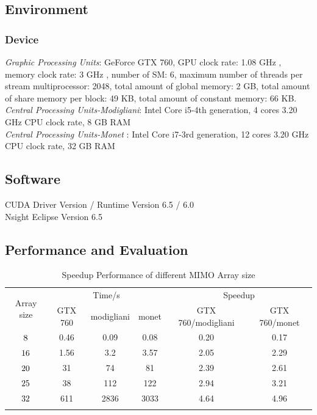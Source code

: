 \documentclass[12pt,a4paper,final]{article}
\begin{document}
\begin{spacing}{2.5}
\subsection{Environment}
\subsubsection{Device}
\emph{Graphic Processing Units}: GeForce GTX 760, GPU clock rate: 1.08 GHz , memory clock rate: 3 GHz , number of SM: 6, maximum number of threads per stream multiprocessor: 2048, total amount of global memory: 2 GB, total amount of share memory per block: 49 KB, total amount of constant memory: 66 KB. \\
\emph{Central Processing Units-Modigliani}: Intel Core i5-4th generation, 4 cores 3.20 GHz CPU clock rate, 8 GB RAM\\
\emph{Central Processing Units-Monet} : Intel Core i7-3rd generation, 12 cores 3.20 GHz CPU clock rate, 32 GB RAM\\
\subsection{Software}
CUDA Driver Version / Runtime Version      6.5 / 6.0\\
Nsight Eclipse Version 6.5
\subsection{Performance and Evaluation}
\begin{table}[htb]
\caption{Speedup Performance of different MIMO Array size}
\centering
\begin{tabular}{|c|c|c|c|c|c|}
\hline
\multirow{2}{*}{ Array size} & \multicolumn{3}{|c|}{Time/s} & \multicolumn{2}{|c|}{Speedup}\\
\cline{2-6}
&GTX 760 & modigliani & monet & GTX 760/modigliani  & GTX 760/monet \\
\hline
$8\time 8$& 0.46& 0.09&0.08 & 0.20& 0.17\\
\hline
$16\time 16$&1.56 &3.2&3.57& 2.05& 2.29\\
\hline
$20\time 20$&31 & 74& 81& 2.39& 2.61\\
\hline
$25\time 25$& 38& 112& 122& 2.94& 3.21\\
\hline
$32\time 32$& 611&2836&3033&4.64& 4.96 \\
\hline
\label{speedup}
\end{tabular}
\end{table}

\end{spacing}
\end{document}
